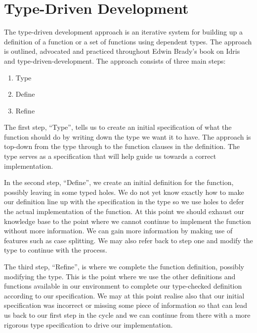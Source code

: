 \documentclass[a4paper, notitlepage]{report}
\begin{document}
\section{Type-Driven Development \label{sec-tdd}}
\label{sec:orgd7523fe}
The type-driven development approach is an iterative system for building up a
definition of a function or a set of functions using dependent types. The
approach is outlined, advocated and practiced throughout Edwin Brady's book
\cite{brady_book_2017} on Idris and type-driven-development. The approach consists
of three main steps:
\begin{enumerate}
\item Type
\item Define
\item Refine
\end{enumerate}

The first step, ``Type'', tells us to create an initial specification of what
the function should do by writing down the type we want it to have. The approach
is top-down from the type through to the function clauses in the definition. The
type serves as a specification that will help guide us towards a correct
implementation.

In the second step, ``Define'', we create an initial definition for the
function, possibly leaving in some typed holes. We do not yet know exactly how
to make our definition line up with the specification in the type so we use
holes to defer the actual implementation of the function. At this point we
should exhaust our knowledge base to the point where we cannot continue to
implement the function without more information. We can gain more information by
making use of features such as case splitting. We may also refer back to step
one and modify the type to continue with the process.

The third step, ``Refine'', is where we complete the function definition,
possibly modifying the type. This is the point where we use the other
definitions and functions available in our environment to complete our
type-checked definition according to our specification. We may at this point
realise also that our initial specification was incorrect or missing some piece
of information so that can lead us back to our first step in the cycle and we
can continue from there with a more rigorous type specification to drive our
implementation.
\end{document}
